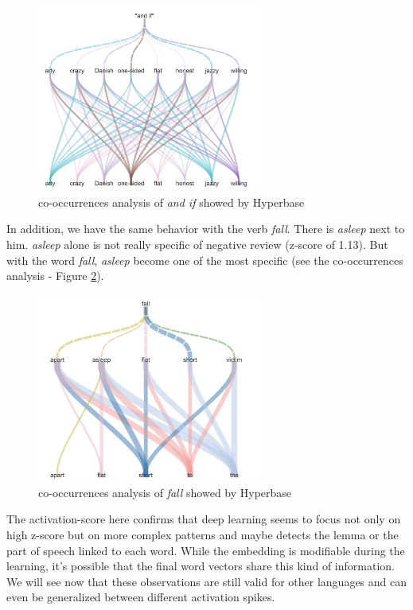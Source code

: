 \begin{figure}[h]
\begin{center}
\includegraphics[width=7.5cm]{img/cooc_english2.png}
\caption{co-occurrences analysis of \textit{and if} showed by Hyperbase}
\label{and_if}
\end{center}
\end{figure}

In addition, we have the same behavior with the verb \textit{fall}. There is \textit{asleep} next to him. \textit{asleep} alone is not really specific of negative review (z-score of 1.13). But with the word \textit{fall}, \textit{asleep} become one of the most specific (see the co-occurrences analysis - Figure \ref{fall}).

\begin{figure}[h]
\begin{center}
\includegraphics[width=7.5cm]{img/cooc_english.png}
\caption{co-occurrences analysis of \textit{fall} showed by Hyperbase}
\label{fall}
\end{center}
\end{figure}

The activation-score here confirms that deep learning seems to focus not only on high z-score but on more complex patterns and maybe detects the lemma or the part of speech linked to each word. While the embedding is modifiable during the learning, it's possible that the final word vectors share this kind of information. We will see now that these observations are still valid for other languages and can even be generalized between different activation spikes.


